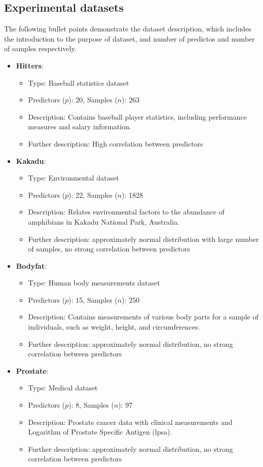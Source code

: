 \subsection{Experimental datasets}
The following bullet points demonstrate the dataset description, which includes the introduction to the purpose of dataset, and number of predictos and number of samples respectively.
\begin{itemize}
	
	\item \textbf{Hitters}:
	\begin{itemize}
		\item Type: Baseball statistics dataset
		\item Predictors ($p$): 20, Samples ($n$): 263
		\item Description: Contains baseball player statistics, including performance measures and salary information.
		\item Further description: High correlation between predictors
	\end{itemize}
	
	\item \textbf{Kakadu}:
	\begin{itemize}
		\item Type: Environmental dataset
		\item Predictors ($p$): 22, Samples ($n$): 1828
		\item Description: Relates environmental factors to the abundance of amphibians in Kakadu National Park, Australia.
		\item Further description: approximately normal distribution with large number of samples, no strong correlation between predictors
	\end{itemize}
	
	\item \textbf{Bodyfat}:
	\begin{itemize}
		\item Type: Human body measurements dataset
		\item Predictors ($p$): 15, Samples ($n$): 250
		\item Description: Contains measurements of various body parts for a sample of individuals, such as weight, height, and circumferences.
		\item Further description: approximately normal distribution, no strong correlation between predictors
	\end{itemize}
	\item \textbf{Prostate}:
	\begin{itemize}
		\item Type: Medical dataset
		\item Predictors ($p$): 8, Samples ($n$): 97
		\item Description: Prostate cancer data with clinical measurements and Logarithm of Prostate Specific Antigen (lpsa).
		\item Further description: approximately normal distribution, no strong correlation between predictors
	\end{itemize}
	

\end{itemize}
